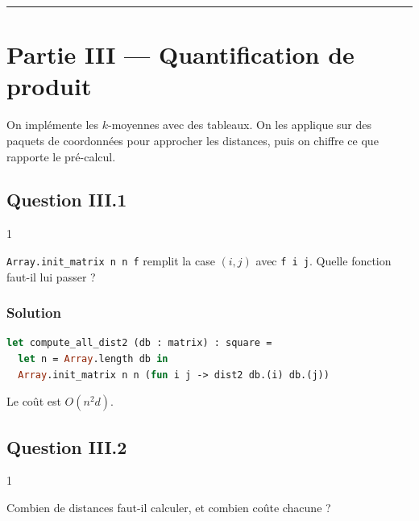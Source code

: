 \documentclass[11pt,a4paper]{article}
\begin{document}
\begin{center}\rule{0.5\linewidth}{0.5pt}\end{center}

\hypertarget{partie-iii-quantification-de-produit}{%
\section{Partie III --- Quantification de produit}\label{partie-iii-quantification-de-produit}}

On implémente les \(k\)-moyennes avec des tableaux. On les applique sur des paquets de coordonnées pour approcher les distances, puis on chiffre ce que rapporte le pré-calcul.

\hypertarget{question-iii.1}{%
\subsection{Question III.1}\label{question-iii.1}}

\begin{indication}{1}

\texttt{Array.init\_matrix\ n\ n\ f} remplit la case \((i,j)\) avec \texttt{f\ i\ j}. Quelle fonction faut-il lui passer ?

\end{indication}

\hypertarget{solution-17}{%
\subsubsection{Solution}\label{solution-17}}

\begin{lstlisting}[language=Caml]
let compute_all_dist2 (db : matrix) : square =
  let n = Array.length db in
  Array.init_matrix n n (fun i j -> dist2 db.(i) db.(j))
\end{lstlisting}

Le coût est \(O(n^2 d)\).

\hypertarget{question-iii.2}{%
\subsection{Question III.2}\label{question-iii.2}}

\begin{indication}{1}

Combien de distances faut-il calculer, et combien coûte chacune ?

\end{indication}
\end{document}
